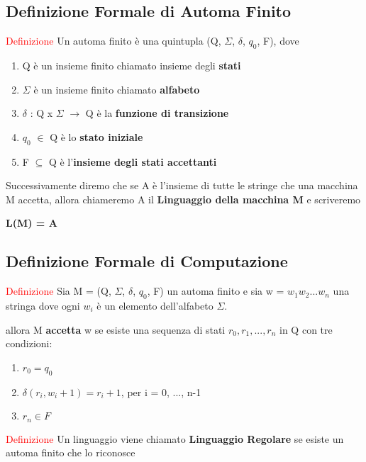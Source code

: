 \documentclass{article}
\begin{document}
\subsection{Definizione Formale di Automa Finito}

\textcolor{red}{Definizione}
Un automa finito è una quintupla (Q, $\Sigma$, $\delta$, $q_0$, F), dove
\begin{enumerate}
    \item Q è un insieme finito chiamato insieme degli \textbf{stati}
    \item $\Sigma$ è un insieme finito chiamato \textbf{alfabeto}
    \item $\delta$ : Q x $\Sigma$ $\rightarrow$ Q è la \textbf{funzione di
    transizione}
    \item $q_0$ $\in$ Q è lo \textbf{stato iniziale}
    \item F $\subseteq$ Q è l'\textbf{insieme degli stati accettanti}
\end{enumerate}

Successivamente diremo che se A è l'insieme di tutte le stringe che una macchina
M accetta, allora chiameremo A il \textbf{Linguaggio della macchina M} e
scriveremo

\begin{center}
    \textbf{L(M) = A}
\end{center}

\subsection{Definizione Formale di Computazione}

\textcolor{red}{Definizione}
Sia M = (Q, $\Sigma$, $\delta$, $q_0$, F) un automa finito e sia w =
$w_1w_2...w_n$ una stringa dove ogni $w_i$ è un elemento dell'alfabeto $\Sigma$.

allora M \textbf{accetta} w se esiste una sequenza di stati $r_0, r_1, ..., r_n$
in Q con tre condizioni:

\begin{enumerate}
    \item $r_0 = q_0$
    \item $\delta (r_i, w_i+1) = r_i+1$, per i = 0, ..., n-1
    \item $r_n \in F$
\end{enumerate}

\textcolor{red}{Definizione}
Un linguaggio viene chiamato \textbf{Linguaggio Regolare} se esiste un automa
finito che lo riconosce
\end{document}
